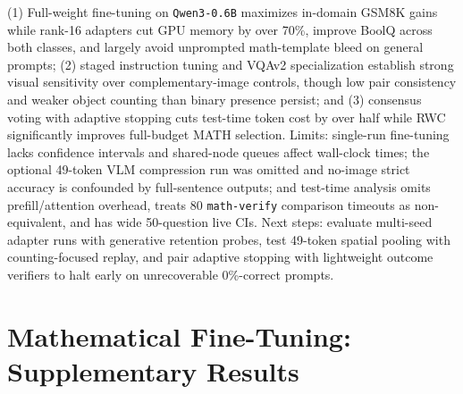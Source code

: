 \documentclass{article}
\renewcommand{\small}{\footnotesize}}
\begin{document}
(1) Full-weight fine-tuning on \texttt{Qwen3-0.6B} maximizes in-domain GSM8K gains while rank-16 adapters cut GPU memory by over 70\%, improve BoolQ across both classes, and largely avoid unprompted math-template bleed on general prompts; (2) staged instruction tuning and VQAv2 specialization establish strong visual sensitivity over complementary-image controls, though low pair consistency and weaker object counting than binary presence persist; and (3) consensus voting with adaptive stopping cuts test-time token cost by over half while RWC significantly improves full-budget MATH selection. Limits: single-run fine-tuning lacks confidence intervals and shared-node queues affect wall-clock times; the optional 49-token VLM compression run was omitted and no-image strict accuracy is confounded by full-sentence outputs; and test-time analysis omits prefill/attention overhead, treats 80 \texttt{math-verify} comparison timeouts as non-equivalent, and has wide 50-question live CIs. Next steps: evaluate multi-seed adapter runs with generative retention probes, test 49-token spatial pooling with counting-focused replay, and pair adaptive stopping with lightweight outcome verifiers to halt early on unrecoverable 0\%-correct prompts.

\clearpage

{
\small

\nocite{*}

}

\clearpage

\appendix

\section{Mathematical Fine-Tuning: Supplementary Results}
\label{app:finetuning}
\end{document}
